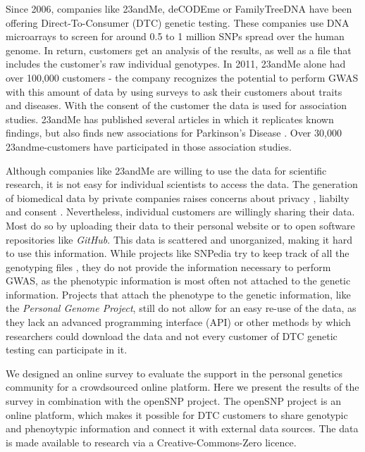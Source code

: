 \documentclass[10pt]{article}
\begin{document}
Since 2006, companies like 23andMe, deCODEme or FamilyTreeDNA have been offering Direct-To-Consumer (DTC) genetic testing. 
These companies use DNA microarrays to screen for around 0.5 to 1 million SNPs spread over the human genome. In return, customers 
get an analysis of the results, as well as a file that includes the customer's raw individual genotypes. In 2011, 23andMe 
alone had over 100,000 customers \cite{23andMe2011}
- the company recognizes the potential to perform GWAS with this amount of data by using surveys to ask their customers about 
traits and diseases. With the consent of the customer the data is used for association studies. 23andMe has published several 
articles in which it replicates known findings, but also finds new associations for Parkinson's Disease \cite{Eriksson2010, Do2011}. 
Over 30,000 23andme-customers have participated in those association studies.  

Although companies like 23andMe are willing to use the data for scientific research,
it is not easy for individual scientists to access the data. 
The generation of biomedical data by private companies raises concerns about privacy \cite{23andMe2012}, 
liabilty and consent \cite{Caulfield2011}. 
Nevertheless, individual customers are willingly sharing their data. Most do so by uploading their data to
their personal website or to open software repositories like \textit{GitHub}. 
This data is scattered and unorganized, making it hard to use this information. While projects like SNPedia try to keep track of all 
the genotyping files \cite{Cariaso2011}, they do not provide the information necessary to perform GWAS, as the phenotypic information is 
most often not attached to the genetic information. Projects that attach the phenotype to the genetic information, 
like the \textit{Personal Genome Project}, still do not allow for an easy re-use of the data, as they lack an advanced programming interface (API) 
or other methods by which researchers could download the data and not every customer of DTC genetic testing can participate in it.  

We designed an online survey to evaluate the support in the personal genetics community for a crowdsourced online platform. Here we present the results of the survey in combination with the openSNP project. 
The openSNP project is an online platform, which makes it possible for DTC customers to share genotypic and phenoytypic information and connect it with external data sources. 
The data is made available to research via a Creative-Commons-Zero licence.
\end{document}
